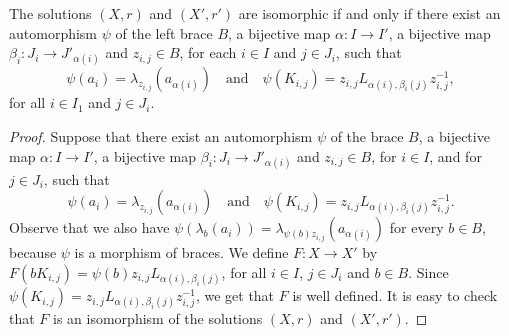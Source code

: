 \begin{theorem}\label{isomorphism}
	The solutions $(X,r)$ and $(X',r')$ are isomorphic if and only if
	there exist an automorphism $\psi$ of the left brace $B$, a
	bijective map $\alpha\colon I\rightarrow I'$, a bijective map
	$\beta_i\colon J_i\rightarrow J'_{\alpha(i)}$ and $z_{i,j}\in B$,
	for each $i\in I$ and $j\in J_i$, such that
	$$\psi(a_i)=\lambda_{z_{i,j}}(a_{\alpha(i)})\quad\mbox{and}\quad \psi(K_{i,j})=z_{i,j}L_{\alpha(i),\beta_i(j)}z_{i,j}^{-1},$$
	for all $i\in I_1$ and $j\in J_i$.
\end{theorem}

\begin{proof}
	Suppose that there exist an automorphism $\psi$ of the brace
	$B$, a bijective map $\alpha\colon I\rightarrow I'$, a bijective map
	$\beta_i\colon J_i\rightarrow J'_{\alpha(i)}$
	and $z_{i,j}\in B$, for $i\in I$, and for $j\in J_i$, such that
	$$\psi(a_i)=\lambda_{z_{i,j}}(a_{\alpha(i)})\quad\mbox{and}\quad \psi(K_{i,j})=z_{i,j}L_{\alpha(i),\beta_i(j)}z_{i,j}^{-1}.$$
	Observe that we also have
	$\psi(\lambda_b(a_i))=\lambda_{\psi(b)z_{i,j}}(a_{\alpha(i)})$ for
	every $b\in B$, because $\psi$ is a morphism of braces. We define
	$F\colon X\rightarrow X'$ by
	$F(bK_{i,j})=\psi(b)z_{i,j}L_{\alpha(i),\beta_i(j)}$, for all $i\in
	I$, $j\in J_i$ and $b\in B$. Since
	$\psi(K_{i,j})=z_{i,j}L_{\alpha(i),\beta_i(j)}z_{i,j}^{-1}$,  we get
	that  $F$ is well defined. It is easy to check that $F$ is an
	isomorphism of the solutions $(X,r)$ and $(X',r')$.
	

\end{proof}
